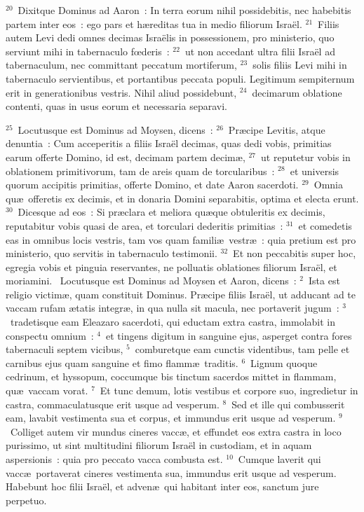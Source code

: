 ${}^{20}$~Dixitque Dominus ad Aaron~: In terra eorum nihil possidebitis, nec habebitis partem inter eos~: ego pars et h\ae reditas tua in medio filiorum Isra\"el.
${}^{21}$~Filiis autem Levi dedi omnes decimas Isra\"elis in possessionem, pro ministerio, quo serviunt mihi in tabernaculo fœderis~:
${}^{22}$~ut non accedant ultra filii Isra\"el ad tabernaculum, nec committant peccatum mortiferum,
${}^{23}$~solis filiis Levi mihi in tabernaculo servientibus, et portantibus peccata populi. Legitimum sempiternum erit in generationibus vestris. Nihil aliud possidebunt,
${}^{24}$~decimarum oblatione contenti, quas in usus eorum et necessaria separavi.


${}^{25}$~Locutusque est Dominus ad Moysen, dicens~:
${}^{26}$~Pr\ae cipe Levitis, atque denuntia~: Cum acceperitis a filiis Isra\"el decimas, quas dedi vobis, primitias earum offerte Domino, id est, decimam partem decim\ae ,
${}^{27}$~ut reputetur vobis in oblationem primitivorum, tam de areis quam de torcularibus~:
${}^{28}$~et universis quorum accipitis primitias, offerte Domino, et date Aaron sacerdoti.
${}^{29}$~Omnia qu\ae\ offeretis ex decimis, et in donaria Domini separabitis, optima et electa erunt.
${}^{30}$~Dicesque ad eos~: Si pr\ae clara et meliora qu\ae que obtuleritis ex decimis, reputabitur vobis quasi de area, et torculari dederitis primitias~:
${}^{31}$~et comedetis eas in omnibus locis vestris, tam vos quam famili\ae\ vestr\ae~: quia pretium est pro ministerio, quo servitis in tabernaculo testimonii.
${}^{32}$~Et non peccabitis super hoc, egregia vobis et pinguia reservantes, ne polluatis oblationes filiorum Isra\"el, et moriamini.
~\lettrine[lines=10,image=true,loversize=0.05,lraise=-0.03]{L}{}ocutusque est Dominus ad Moysen et Aaron, dicens~:
${}^{2}$~Ista est religio victim\ae , quam constituit Dominus. Pr\ae cipe filiis Isra\"el, ut adducant ad te vaccam rufam \ae tatis integr\ae , in qua nulla sit macula, nec portaverit jugum~:
${}^{3}$~tradetisque eam Eleazaro sacerdoti, qui eductam extra castra, immolabit in conspectu omnium~:
${}^{4}$~et tingens digitum in sanguine ejus, asperget contra fores tabernaculi septem vicibus,
${}^{5}$~comburetque eam cunctis videntibus, tam pelle et carnibus ejus quam sanguine et fimo flamm\ae\ traditis.
${}^{6}$~Lignum quoque cedrinum, et hyssopum, coccumque bis tinctum sacerdos mittet in flammam, qu\ae\ vaccam vorat.
${}^{7}$~Et tunc demum, lotis vestibus et corpore suo, ingredietur in castra, commaculatusque erit usque ad vesperum.
${}^{8}$~Sed et ille qui combusserit eam, lavabit vestimenta sua et corpus, et immundus erit usque ad vesperum.
${}^{9}$~Colliget autem vir mundus cineres vacc\ae , et effundet eos extra castra in loco purissimo, ut sint multitudini filiorum Isra\"el in custodiam, et in aquam aspersionis~: quia pro peccato vacca combusta est.
${}^{10}$~Cumque laverit qui vacc\ae\ portaverat cineres vestimenta sua, immundus erit usque ad vesperum. Habebunt hoc filii Isra\"el, et adven\ae\ qui habitant inter eos, sanctum jure perpetuo.


